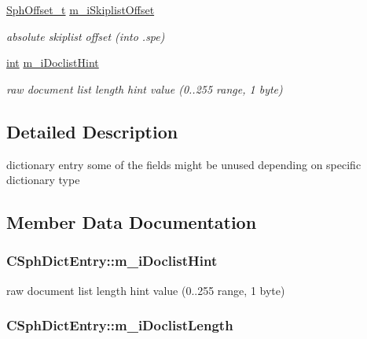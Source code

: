 \begin{DoxyCompactItemize}
\hyperlink{sphinx_8h_a0fb3b64afebef33c61367714754eaa90}{Sph\-Offset\-\_\-t} \hyperlink{structCSphDictEntry_abfb6b23a4b17ee0d0b8a4c923f1a575a}{m\-\_\-i\-Skiplist\-Offset}
\begin{DoxyCompactList}\small\item\em absolute skiplist offset (into .spe) \end{DoxyCompactList}\item 
\hyperlink{sphinxexpr_8cpp_a4a26e8f9cb8b736e0c4cbf4d16de985e}{int} \hyperlink{structCSphDictEntry_a2f1681aba263bb17ccdcc90fb53c5801}{m\-\_\-i\-Doclist\-Hint}
\begin{DoxyCompactList}\small\item\em raw document list length hint value (0..255 range, 1 byte) \end{DoxyCompactList}\end{DoxyCompactItemize}


\subsection{Detailed Description}
dictionary entry some of the fields might be unused depending on specific dictionary type 

\subsection{Member Data Documentation}
\hypertarget{structCSphDictEntry_a2f1681aba263bb17ccdcc90fb53c5801}{
\subsubsection[{m\-\_\-i\-Doclist\-Hint}]{ C\-Sph\-Dict\-Entry\-::m\-\_\-i\-Doclist\-Hint}}\label{structCSphDictEntry_a2f1681aba263bb17ccdcc90fb53c5801}


raw document list length hint value (0..255 range, 1 byte) 

\hypertarget{structCSphDictEntry_ae6fd52be73564ec837615af17d29c0ac}{
\subsubsection[{m\-\_\-i\-Doclist\-Length}]{ C\-Sph\-Dict\-Entry\-::m\-\_\-i\-Doclist\-Length}}\label{structCSphDictEntry_ae6fd52be73564ec837615af17d29c0ac}


